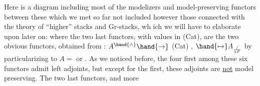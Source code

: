 Here is a diagram including most of the modelizers and model-preserving
functors between these which we met so far\hand{,}  \hand{(}not included however
those connected with the theory of ``higher'' stacks and Gr-stacks, wh ich we
will have to elaborate upon later on\hand{)}:
where the two last functors, with values in (Cat), are the two obvious
functors, obtained from
\hand{(**)} : $A^{\hand{\wedge}}\hand{\to}$ (Cat) ,  $\hand{\mapsto} A_{/\over{a}{F}}$
by particularizing to $A=$\hand{$\Delta$} or \hand{$\square$}. As we noticed before, the four first
among these six functors admit left adjoints, but except for the first,
these adjoints are \uline{not} model preserving. The two last functors, and more
